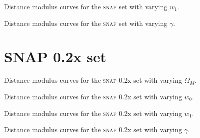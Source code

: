   {Distance modulus curves for the \textsc{snap} set with varying $w_1$.}

  {Distance modulus curves for the \textsc{snap} set with varying $\gamma$.}

\section{SNAP 0.2x set}
\label{sec:snap-02x-set}

  {Distance modulus curves for the \textsc{snap} 0.2x set with varying $\Omega_M$.}

  {Distance modulus curves for the \textsc{snap} 0.2x set with varying $w_0$.}

  {Distance modulus curves for the \textsc{snap} 0.2x set with varying $w_1$.}

  {Distance modulus curves for the \textsc{snap} 0.2x set with varying $\gamma$.}
